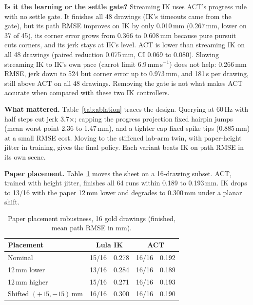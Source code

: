 \documentclass[conference]{IEEEtran}
\newcommand{\mm}{\,mm\xspace}
\begin{document}
\textbf{Is it the learning or the settle gate?} Streaming IK uses ACT's progress rule with no settle gate. It
finishes all 48 drawings (IK's timeouts came from the gate), but its path RMSE improves on IK by only 0.010\mm
(0.267\mm, lower on 37 of 45), its corner error grows from 0.366 to 0.608\mm because pure pursuit cuts corners,
and its jerk stays at IK's level. ACT is lower than streaming IK on all 48 drawings (paired reduction 0.075\mm,
CI 0.069 to 0.080). Slowing streaming IK to IK's own pace (carrot limit 6.9\mm\,s$^{-1}$) does not help:
0.266\mm RMSE, jerk down to 524 but corner error up to 0.973\mm, and 181\,s per drawing, still above ACT on all
48 drawings. Removing the gate is not what makes ACT accurate when compared with these two IK controllers.

\textbf{What mattered.} Table~\ref{tab:ablation} traces the design. Querying at 60\,Hz with half steps cut jerk
3.7$\times$; capping the progress projection fixed hairpin jumps (mean worst point 2.36 to 1.47\mm), and a tighter
cap fixed spike tips (0.885\mm) at a small RMSE cost. Moving to the stiffened lab-arm twin, with paper-height
jitter in training, gives the final policy. Each variant beats IK on path RMSE in its own scene.

\textbf{Paper placement.} Table~\ref{tab:robust} moves the sheet on a 16-drawing subset. ACT, trained with height
jitter, finishes all 64 runs within 0.189 to 0.193\mm. IK drops to 13/16 with the paper 12\mm lower and
degrades to 0.300\mm under a planar shift.

\begin{table}[t]
\centering
\caption{Paper placement robustness, 16 gold drawings (finished, mean path RMSE in mm).}
\label{tab:robust}
\setlength{\tabcolsep}{4pt}
\begin{tabular}{lcccc}
\toprule
Placement & \multicolumn{2}{c}{Lula IK} & \multicolumn{2}{c}{ACT} \\
\midrule
Nominal                & 15/16 & 0.278 & 16/16 & 0.192 \\
12\mm lower            & 13/16 & 0.284 & 16/16 & 0.189 \\
12\mm higher           & 15/16 & 0.271 & 16/16 & 0.193 \\
Shifted $(+15,-15)$\mm & 16/16 & 0.300 & 16/16 & 0.190 \\
\bottomrule
\end{tabular}
\end{table}
\end{document}
